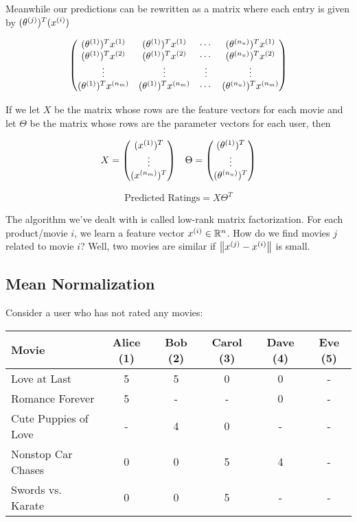 Meanwhile our predictions can be rewritten as a matrix where each entry is given by $(\theta_{}^{(j)})^T (x_{}^{(i)})$

\[
    \mqty(
        (\theta\s{1})^T x\s{1} & (\theta\s{1})^T x\s{1} & \cdots & (\theta\s{n_u})^T x\s{1} \\
        (\theta\s{1})^T x\s{2} & (\theta\s{1})^T x\s{2} & \cdots & (\theta\s{n_u})^T x\s{2} \\
        \vdots & \vdots & \vdots & \vdots \\
        (\theta\s{1})^T x\s{n_m} & (\theta\s{1})^T x\s{n_m} & \cdots &  (\theta\s{n_u})^T x\s{n_m}
    )
\]

If we let $X$ be the matrix whose rows are the feature vectors for each movie and let $\Theta$ be
the matrix whose rows are the parameter vectors for each user, then

\[
    X = \mqty( (x\s{1})^T \\ \vdots \\ (x\s{n_m})^T )
    \quad
    \Theta = \mqty( (\theta\s{1})^T \\ \vdots \\ (\theta\s{n_u})^T )
\]

\[
    \text{Predicted Ratings} = X\Theta^T
\]

The algorithm we've dealt with is called low-rank matrix factorization.
For each product/movie $i$, we learn a feature vector $x_{}^{(i)} \in \mathbb{R}^n$.
How do we find movies $j$ related to movie $i$?
Well, two movies are similar if $\left\lVert x_{}^{(j)} - x_{}^{(i)} \right\rVert$ is small.

\subsection{Mean Normalization}

Consider a user who has not rated any movies:

\begin{center}
\begin{tabular}{l|ccccc}
    Movie                & Alice (1) & Bob (2) & Carol (3) & Dave (4) & Eve (5) \\ \hline
    Love at Last         & 5 & 5 & 0 & 0 & - \\
    Romance Forever      & 5 & - & - & 0 & - \\
    Cute Puppies of Love & - & 4 & 0 & - & - \\
    Nonstop Car Chases   & 0 & 0 & 5 & 4 & - \\
    Swords vs. Karate    & 0 & 0 & 5 & - & -
\end{tabular}
\end{center}

